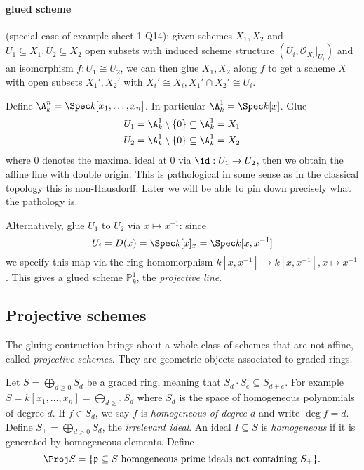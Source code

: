 \documentclass[a4paper]{article}
\renewcommand*{\P}{\mathbb{P}}
\newcommand{\sh}[1]{\mathcal{#1}} %
\begin{document}
\paragraph{glued scheme}

(special case of example sheet 1 Q14): given schemes \(X_1, X_2\) and \(U_1 \subseteq X_1, U_2 \subseteq X_2\) open subsets with induced scheme structure \((U_i, \sh O_{X_i}|_{U_i})\) and an isomorphism \(f: U_1 \cong U_2\), we can then glue \(X_1, X_2\) along \(f\) to get a scheme \(X\) with open subsets \(X_1', X_2'\) with \(X_i' \cong X_i, X_1' \cap X_2' \cong U_i\).

\begin{eg}
  Define \(\A_k^n = \Spec k[x_1, \dots, x_n]\). In particular \(\A_k^1 = \Spec k[x]\). Glue
  \begin{align*}
    U_1 &= \A_k^1 \setminus \{0\} \subseteq \A_k^1 = X_1 \\
    U_2 &= \A_k^1 \setminus \{0\} \subseteq \A_k^1 = X_2
  \end{align*}
  where \(0\) denotes the maximal ideal at \(0\) via \(\id: U_1 \to U_2\), then we obtain the affine line with double origin. This is pathological in some sense as in the classical topology this is non-Hausdorff. Later we will be able to pin down precisely what the pathology is.

  Alternatively, glue \(U_1\) to \(U_2\) via \(x \mapsto x^{-1}\): since
  \[
    U_i = D(x) = \Spec k[x]_x = \Spec k[x, x^{-1}]
  \]
  we specify this map via the ring homomorphism \(k[x, x^{-1}] \to k[x, x^{-1}], x \mapsto x^{-1}\). This gives a glued scheme \(\P_k^1\), the \emph{projective line}.
\end{eg}

\subsection{Projective schemes}

The gluing contruction brings about a whole class of schemes that are not affine, called \emph{projective schemes}. They are geometric objects associated to graded rings.

Let \(S = \bigoplus_{d \geq 0} S_d\) be a graded ring, meaning that \(S_d \cdot S_e \subseteq S_{d + e}\). For example \(S = k[x_1, \dots, x_n] = \bigoplus_{d \geq 0} S_d\) where \(S_d\) is the space of homogeneous polynomials of degree \(d\). If \(f \in S_d\), we say \(f\) is \emph{homogeneous of degree \(d\)} and write \(\deg f = d\). Define \(S_+ = \bigoplus_{d > 0} S_d\), the \emph{irrelevant ideal}. An ideal \(I \subseteq S\) is \emph{homogeneous} if it is generated by homogeneous elements. Define
\[
  \Proj S = \{\mathfrak p \subseteq S \text{ homogeneous prime ideals not containing } S_+\}.
\]
\end{document}
